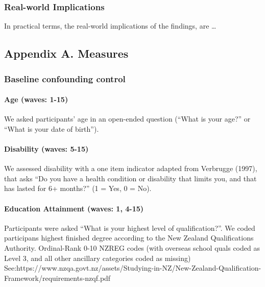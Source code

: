 \documentclass[
  letterpaper,
  DIV=11,
  numbers=noendperiod]{scrartcl}
\let\oldparagraph\paragraph
\renewcommand{\paragraph}[1]{\oldparagraph{#1}\mbox{}}
\begin{document}
\hypertarget{real-world-implications}{%
\subsubsection{Real-world Implications}\label{real-world-implications}}

In practical terms, the real-world implications of the findings, are
\ldots{}

\newpage{}

\hypertarget{appendix-a.-measures}{%
\subsection{Appendix A. Measures}\label{appendix-a.-measures}}

\hypertarget{baseline-confounding-control}{%
\subsubsection{Baseline confounding
control}\label{baseline-confounding-control}}

\hypertarget{age-waves-1-15}{%
\paragraph{Age (waves: 1-15)}\label{age-waves-1-15}}

We asked participants' age in an open-ended question (``What is your
age?'' or ``What is your date of birth'').

\hypertarget{disability-waves-5-15}{%
\paragraph{Disability (waves: 5-15)}\label{disability-waves-5-15}}

We assessed disability with a one item indicator adapted from Verbrugge
(1997), that asks ``Do you have a health condition or disability that
limits you, and that has lasted for 6+ months?'' (1 = Yes, 0 = No).

\hypertarget{education-attainment-waves-1-4-15}{%
\paragraph{Education Attainment (waves: 1,
4-15)}\label{education-attainment-waves-1-4-15}}

Participants were asked ``What is your highest level of
qualification?''. We coded participans highest finished degree according
to the New Zealand Qualifications Authority. Ordinal-Rank 0-10 NZREG
codes (with overseas school quals coded as Level 3, and all other
ancillary categories coded as missing)
See:https://www.nzqa.govt.nz/assets/Studying-in-NZ/New-Zealand-Qualification-Framework/requirements-nzqf.pdf
\end{document}
